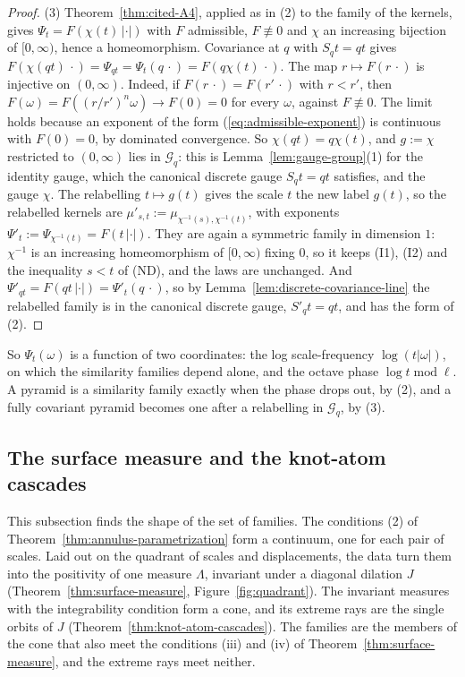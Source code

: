 \begin{proof}
(3) Theorem~\ref{thm:cited-A4}, applied as in (2) to the family of the kernels, gives
$\Psi_t = F(\chi(t)\,|\cdot|)$ with $F$ admissible, $F \not\equiv 0$ and
$\chi$ an increasing bijection of $[0,\infty)$, hence a homeomorphism. Covariance at $q$ with
$S_qt = qt$ gives $F(\chi(qt)\,\cdot) = \Psi_{qt} = \Psi_t(q\,\cdot) = F(q\chi(t)\,\cdot)$. The map
$r \mapsto F(r\,\cdot)$ is injective on $(0,\infty)$. Indeed, if $F(r\,\cdot) = F(r'\,\cdot)$ with
$r < r'$, then $F(\omega) = F((r/r')^n\omega) \to F(0) = 0$ for every $\omega$, against
$F \not\equiv 0$. The limit holds because an exponent of the form (\ref{eq:admissible-exponent}) is
continuous with $F(0) = 0$, by dominated convergence. So
$\chi(qt) = q\chi(t)$, and $g := \chi$ restricted to $(0,\infty)$ lies in $\mathcal{G}_q$: this is
Lemma~\ref{lem:gauge-group}(1) for the identity gauge, which the canonical discrete gauge
$S_qt = qt$ satisfies, and the gauge $\chi$. The relabelling $t \mapsto g(t)$ gives the scale $t$
the new label $g(t)$, so the relabelled kernels are $\mu'_{s,t} := \mu_{\chi^{-1}(s),\chi^{-1}(t)}$,
with exponents $\Psi'_t := \Psi_{\chi^{-1}(t)} = F(t\,|\cdot|)$. They are again a symmetric family
in dimension $1$: $\chi^{-1}$ is an increasing homeomorphism of $[0,\infty)$ fixing $0$, so it
keeps (I1), (I2) and the inequality $s < t$ of (ND), and the laws are unchanged. And
$\Psi'_{qt} = F(qt\,|\cdot|) = \Psi'_t(q\,\cdot)$, so by Lemma~\ref{lem:discrete-covariance-line}
the relabelled family is in the canonical discrete gauge, $S'_qt = qt$, and has the form of (2).
\end{proof}

So $\Psi_t(\omega)$ is a function of two coordinates: the log scale-frequency $\log(t|\omega|)$, on
which the similarity families depend alone, and the octave phase $\log t \operatorname{mod} \ell$. A pyramid
is a similarity family exactly when the phase drops out, by (2), and a fully covariant pyramid
becomes one after a relabelling in $\mathcal{G}_q$, by (3).

\subsection{The surface measure and the knot-atom cascades}
\label{sec:line-surface}

This subsection finds the shape of the set of families. The conditions (2) of
Theorem~\ref{thm:annulus-parametrization} form a continuum, one for each pair of scales. Laid out on
the quadrant of scales and displacements, the \Levy{} data turn them into the positivity of one
measure $\Lambda$, invariant under a diagonal dilation $J$ (Theorem~\ref{thm:surface-measure},
Figure~\ref{fig:quadrant}). The invariant measures with the integrability condition form a cone,
and its extreme rays are the single orbits of $J$ (Theorem~\ref{thm:knot-atom-cascades}). The
families are the members of the cone that also meet the conditions (iii) and (iv) of
Theorem~\ref{thm:surface-measure}, and the extreme rays meet neither.

